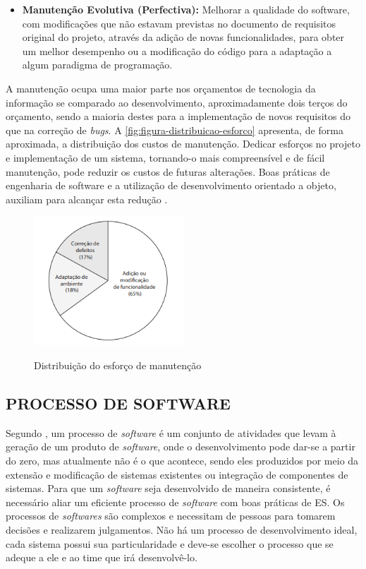  \begin{itemize}  
    \item \textbf{Manutenção Evolutiva (Perfectiva):} Melhorar a qualidade do software, com modificações que não estavam previstas no documento de requisitos original do projeto, através da adição de novas funcionalidades, para obter um melhor desempenho ou a modificação do código para a adaptação a algum paradigma de programação. 
\end{itemize}
    
A manutenção ocupa uma maior parte nos orçamentos de tecnologia da informação se comparado ao desenvolvimento, aproximadamente dois terços do orçamento, sendo a maioria destes para a implementação de novos requisitos do que na correção de \textit{bugs}. A \autoref{fig:figura-distribuicao-esforco} apresenta, de forma aproximada, a distribuição dos custos de manutenção. Dedicar esforços no projeto e implementação de um sistema, tornando-o mais compreensível e de fácil manutenção, pode reduzir os custos de futuras alterações. Boas práticas de engenharia de software e a utilização de desenvolvimento orientado a objeto, auxiliam para alcançar esta redução \cite{iansommerville}.
\begin{figure}[!htb]
    \centering
    \caption{Distribuição do esforço de manutenção}
    \includegraphics[width=0.5\textwidth]{./dados/figuras/distribuicao_do_esforco_de_manutencao}
    \label{fig:figura-distribuicao-esforco}
\end{figure}



\subsection{PROCESSO DE SOFTWARE}
\label{subsec:processoDeSoftware}

Segundo \cite{iansommerville}, um processo de \textit{software} é um conjunto de atividades que levam à geração de um produto de \textit{software}, onde o desenvolvimento pode dar-se a partir do zero, mas atualmente não é o que acontece, sendo eles produzidos por meio da extensão e modificação de sistemas existentes ou integração de componentes de sistemas. Para que um \textit{software} seja desenvolvido de maneira consistente, é necessário aliar um eficiente processo de \textit{software} com boas práticas de ES. Os processos de \textit{softwares} são complexos e necessitam de pessoas para tomarem decisões e realizarem julgamentos. Não há um processo de desenvolvimento ideal, cada sistema possui sua particularidade e deve-se escolher o processo que se adeque a ele e ao time que irá desenvolvê-lo. 

